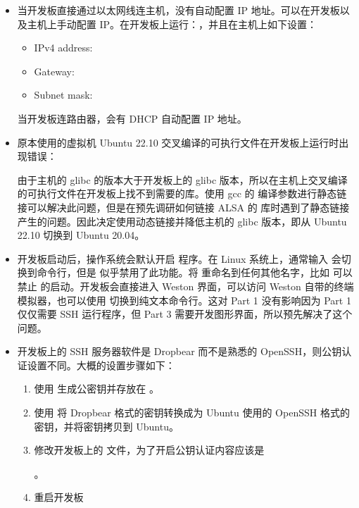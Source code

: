 \begin{itemize}
    \item 当开发板直接通过以太网线连主机，没有自动配置 IP 地址。可以在开发板以及主机上手动配置 IP。在开发板上运行：，并且在主机上如下设置：

    \begin{itemize}
        \item IPv4 address: 
        \item Gateway: 
        \item Subnet mask: 
    \end{itemize}

    当开发板连路由器，会有 DHCP 自动配置 IP 地址。

    \item 原本使用的虚拟机 Ubuntu 22.10 交叉编译的可执行文件在开发板上运行时出现错误：
    
    
    由于主机的 glibc 的版本大于开发板上的 glibc 版本，所以在主机上交叉编译的可执行文件在开发板上找不到需要的库。使用 gcc 的  编译参数进行静态链接可以解决此问题，但是在预先调研如何链接 ALSA 的  库时遇到了静态链接产生的问题。因此决定使用动态链接并降低主机的 glibc 版本，即从 Ubuntu 22.10 切换到 Ubuntu 20.04。

    \item 开发板启动后，操作系统会默认开启  程序。在 Linux 系统上，通常输入  会切换到命令行，但是  似乎禁用了此功能。将  重命名到任何其他名字，比如  可以禁止  的启动。开发板会直接进入 Weston 界面，可以访问 Weston 自带的终端模拟器，也可以使用  切换到纯文本命令行。这对 Part 1 没有影响因为 Part 1 仅仅需要 SSH 运行程序，但 Part 3 需要开发图形界面，所以预先解决了这个问题。
    
    \item 开发板上的 SSH 服务器软件是 Dropbear 而不是熟悉的 OpenSSH，则公钥认证设置不同。大概的设置步骤如下：
    \begin{enumerate}
        \item 使用 \href{https://linux.die.net/man/8/dropbearkey}{} 生成公密钥并存放在 。
        \item 使用 \href{https://manpages.ubuntu.com/manpages/trusty/man1/dropbearconvert.1.html}{} 将 Dropbear 格式的密钥转换成为 Ubuntu 使用的 OpenSSH 格式的密钥，并将密钥拷贝到 Ubuntu。
        \item 修改开发板上的  文件，为了开启公钥认证内容应该是
        
        。
        \item 重启开发板
    \end{enumerate}
    
\end{itemize}
